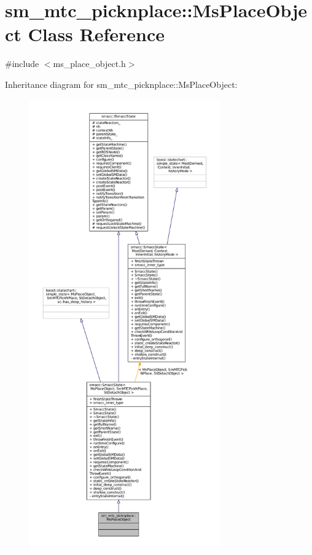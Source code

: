 \hypertarget{classsm__mtc__picknplace_1_1MsPlaceObject}{}\section{sm\+\_\+mtc\+\_\+picknplace\+:\+:Ms\+Place\+Object Class Reference}
\label{classsm__mtc__picknplace_1_1MsPlaceObject}


{\ttfamily \#include $<$ms\+\_\+place\+\_\+object.\+h$>$}



Inheritance diagram for sm\+\_\+mtc\+\_\+picknplace\+:\+:Ms\+Place\+Object\+:
\nopagebreak
\begin{figure}[H]
\begin{center}
\leavevmode
\includegraphics[height=550pt]{classsm__mtc__picknplace_1_1MsPlaceObject__inherit__graph}
\end{center}
\end{figure}


